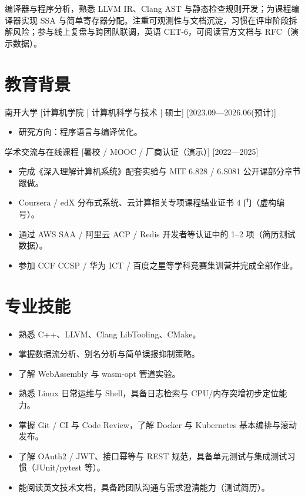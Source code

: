 \documentclass{resume-photo}
\begin{document}

\ResumeTitle

\noindent 编译器与程序分析，熟悉 LLVM IR、Clang AST 与静态检查规则开发；为课程编译器实现 SSA 与简单寄存器分配。注重可观测性与文档沉淀，习惯在评审阶段拆解风险；参与线上复盘与跨团队联调，英语 CET-6，可阅读官方文档与 RFC（演示数据）。

\section{教育背景}
\ResumeItem
{南开大学}
[\textnormal{计算机学院 | 计算机科学与技术 | 硕士}]
[2023.09—2026.06(预计)]

\begin{itemize}
  \item 研究方向：程序语言与编译优化。
\end{itemize}


\ResumeItem
{学术交流与在线课程}
[\textnormal{暑校 / MOOC / 厂商认证（演示）}]
[2022—2025]

\begin{itemize}
  \item 完成《深入理解计算机系统》配套实验与 MIT 6.828 / 6.S081 公开课部分章节跟做。
  \item Coursera / edX 分布式系统、云计算相关专项课程结业证书 4 门（虚构编号）。
  \item 通过 AWS SAA / 阿里云 ACP / Redis 开发者等认证中的 1--2 项（简历测试数据）。
  \item 参加 CCF CCSP / 华为 ICT / 百度之星等学科竞赛集训营并完成全部作业。
\end{itemize}



\section{专业技能}
\begin{itemize}
  \item 熟悉 C++、LLVM、Clang LibTooling、CMake。
  \item 掌握数据流分析、别名分析与简单误报抑制策略。
  \item 了解 WebAssembly 与 wasm-opt 管道实验。
  \item 熟悉 Linux 日常运维与 Shell，具备日志检索与 CPU/内存突增初步定位能力。
  \item 掌握 Git / CI 与 Code Review，了解 Docker 与 Kubernetes 基本编排与滚动发布。
  \item 了解 OAuth2 / JWT、接口幂等与 REST 规范，具备单元测试与集成测试习惯（JUnit/pytest 等）。
  \item 能阅读英文技术文档，具备跨团队沟通与需求澄清能力（测试简历）。
\end{itemize}
\end{document}

